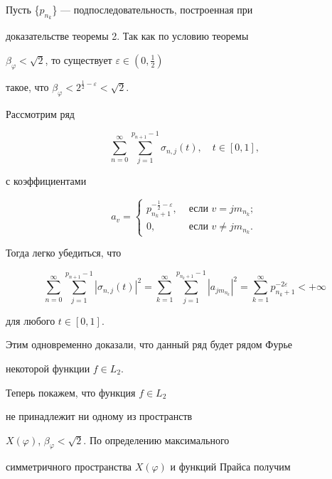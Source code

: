 \begin{pf}


Пусть \{$p_{n_k}$\} --- подпоследовательность, построенная при 


доказательстве теоремы 2. Так как по условию теоремы 


$\beta_{\varphi}<\sqrt{2}$, то существует $\varepsilon \in (0,\frac{1}{2})$ 


такое, что $\beta_{\varphi}<2^{\frac{1}{2}-\varepsilon}<\sqrt{2}$.





Рассмотрим ряд


$$


\sum_{n=0}^{\infty}\sum_{j=1}^{p_{n+1}-1}\sigma_{n,j}(t), \quad t\in[0,1],


$$


с коэффициентами


$$


a_v=


\begin{cases}


p_{n_k+1}^{-\frac{1}{2}-\varepsilon}, & \text{ если } v=jm_{n_{k}};\\


0, & \text{ если } v\neq jm_{n_{k}}.


\end{cases}


$$


Тогда легко убедиться, что


$$


\sum_{n=0}^{\infty}\sum_{j=1}^{p_{n+1}-1}|\sigma_{n,j}(t)|^2=


\sum_{k=1}^{\infty}\sum_{j=1}^{p_{n_k+1}-1}|a_{jm_{n_k}}|^2=


\sum_{k=1}^{\infty}p_{n_k+1}^{-2\varepsilon}<+\infty


$$


для любого $t\in[0,1]$. 


Этим одновременно доказали, что данный ряд будет рядом Фурье


некоторой функции $f\in L_2$.





Теперь покажем, что функция $f\in L_2$ 


не принадлежит ни одному из пространств


$X(\varphi)$, $\beta_{\varphi}<\sqrt{2}$. По определению максимального 


симметричного пространства $X(\varphi)$ и функций Прайса получим



\end{pf}
